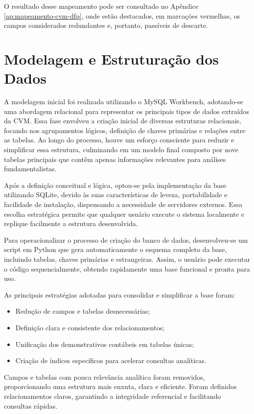 \documentclass[recuosum=1.5cm]{iftex2024}
\begin{document}
O resultado desse mapeamento pode ser consultado no Apêndice \ref{ap:mapeamento-cvm-dfp}, onde estão destacados, em marcações vermelhas, os campos considerados redundantes e, portanto, passíveis de descarte.

\section{Modelagem e Estruturação dos Dados}\label{sec:modelagem}

A modelagem inicial foi realizada utilizando o MySQL Workbench, adotando-se uma abordagem relacional para representar os principais tipos de dados extraídos da CVM. Essa fase envolveu a criação inicial de diversas estruturas relacionais, focando nos agrupamentos lógicos, definição de chaves primárias e relações entre as tabelas. Ao longo do processo, houve um esforço consciente para reduzir e simplificar essa estrutura, culminando em um modelo final composto por nove tabelas principais que contêm apenas informações relevantes para análises fundamentalistas.

Após a definição conceitual e lógica, optou-se pela implementação da base utilizando SQLite, devido às suas características de leveza, portabilidade e facilidade de instalação, dispensando a necessidade de servidores externos. Essa escolha estratégica permite que qualquer usuário execute o sistema localmente e replique facilmente a estrutura desenvolvida.

Para operacionalizar o processo de criação do banco de dados, desenvolveu-se um script em Python que gera automaticamente o esquema completo da base, incluindo tabelas, chaves primárias e estrangeiras. Assim, o usuário pode executar o código sequencialmente, obtendo rapidamente uma base funcional e pronta para uso.

As principais estratégias adotadas para consolidar e simplificar a base foram:

\begin{itemize}
	\item Redução de campos e tabelas desnecessárias;
	\item Definição clara e consistente dos relacionamentos;
	\item Unificação dos demonstrativos contábeis em tabelas únicas;
	\item Criação de índices específicos para acelerar consultas analíticas.
\end{itemize}

Campos e tabelas com pouca relevância analítica foram removidos, proporcionando uma estrutura mais enxuta, clara e eficiente. Foram definidos relacionamentos claros, garantindo a integridade referencial e facilitando consultas rápidas.
\end{document}
